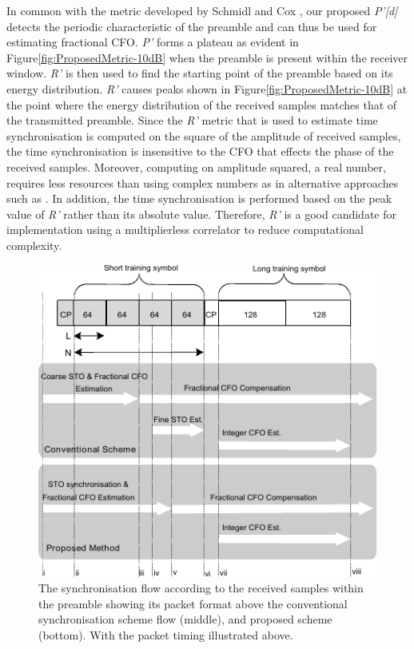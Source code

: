 In common with the metric developed by Schmidl and Cox \cite{Schmidl1997}, our proposed \emph{P'[d]} detects the periodic characteristic of the preamble and can thus be used for estimating fractional CFO.
\emph{P'} forms a plateau as evident in Figure\ref{fig:ProposedMetric-10dB} when the preamble is present within the receiver window.
\emph{R'} is then used to find the starting point of the preamble based on its energy distribution.
\emph{R'} causes peaks shown in Figure\ref{fig:ProposedMetric-10dB} at the point where the energy distribution of the received samples matches that of the transmitted preamble.
Since the \emph{R'} metric that is used to estimate time synchronisation is computed on the square of the amplitude of received samples, the time synchronisation is insensitive to the CFO that effects the phase of the received samples.
Moreover, computing on amplitude squared, a real number, requires less resources than using complex numbers as in alternative approaches such as \cite{Kishore2006}.
In addition, the time synchronisation is performed based on the peak value of \emph{R'} rather than its absolute value.
Therefore, \emph{R'} is a good candidate for implementation using a multiplierless correlator to reduce computational complexity.
\begin{figure}
	\centerline{\includegraphics [width=1\columnwidth] {figures/SynFlow_IVMannotated.pdf}}
	\caption{The synchronisation flow according to the received samples within the preamble showing its packet format above the conventional synchronisation scheme flow (middle), and proposed scheme (bottom). With the packet timing illustrated above.}
	\label{fig:SyncFlow}
\end{figure}
